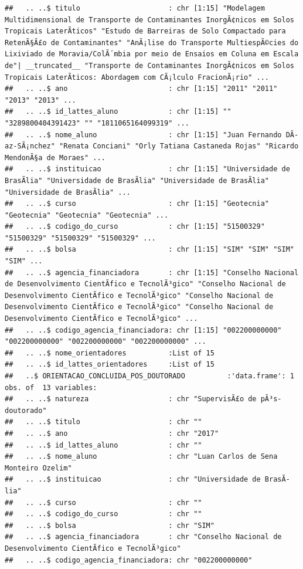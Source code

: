 \documentclass[]{article}
\begin{document}
\begin{verbatim}
##   .. ..$ titulo                     : chr [1:15] "Modelagem Multidimensional de Transporte de Contaminantes InorgÃ¢nicos em Solos Tropicais LaterÃ­ticos" "Estudo de Barreiras de Solo Compactado para RetenÃ§Ã£o de Contaminantes" "AnÃ¡lise do Transporte MultiespÃ©cies do Lixiviado de Moravia/ColÃ´mbia por meio de Ensaios em Coluna em Escala de"| __truncated__ "Transporte de Contaminantes InorgÃ¢nicos em Solos Tropicais LaterÃ­ticos: Abordagem com CÃ¡lculo FracionÃ¡rio" ...
##   .. ..$ ano                        : chr [1:15] "2011" "2011" "2013" "2013" ...
##   .. ..$ id_lattes_aluno            : chr [1:15] "" "3289800404391423" "" "1811065164099319" ...
##   .. ..$ nome_aluno                 : chr [1:15] "Juan Fernando DÃ­az-SÃ¡nchez" "Renata Conciani" "Orly Tatiana Castaneda Rojas" "Ricardo MendonÃ§a de Moraes" ...
##   .. ..$ instituicao                : chr [1:15] "Universidade de BrasÃ­lia" "Universidade de BrasÃ­lia" "Universidade de BrasÃ­lia" "Universidade de BrasÃ­lia" ...
##   .. ..$ curso                      : chr [1:15] "Geotecnia" "Geotecnia" "Geotecnia" "Geotecnia" ...
##   .. ..$ codigo_do_curso            : chr [1:15] "51500329" "51500329" "51500329" "51500329" ...
##   .. ..$ bolsa                      : chr [1:15] "SIM" "SIM" "SIM" "SIM" ...
##   .. ..$ agencia_financiadora       : chr [1:15] "Conselho Nacional de Desenvolvimento CientÃ­fico e TecnolÃ³gico" "Conselho Nacional de Desenvolvimento CientÃ­fico e TecnolÃ³gico" "Conselho Nacional de Desenvolvimento CientÃ­fico e TecnolÃ³gico" "Conselho Nacional de Desenvolvimento CientÃ­fico e TecnolÃ³gico" ...
##   .. ..$ codigo_agencia_financiadora: chr [1:15] "002200000000" "002200000000" "002200000000" "002200000000" ...
##   .. ..$ nome_orientadores          :List of 15
##   .. ..$ id_lattes_orientadores     :List of 15
##   ..$ ORIENTACAO_CONCLUIDA_POS_DOUTORADO          :'data.frame': 1 obs. of  13 variables:
##   .. ..$ natureza                   : chr "SupervisÃ£o de pÃ³s-doutorado"
##   .. ..$ titulo                     : chr ""
##   .. ..$ ano                        : chr "2017"
##   .. ..$ id_lattes_aluno            : chr ""
##   .. ..$ nome_aluno                 : chr "Luan Carlos de Sena Monteiro Ozelim"
##   .. ..$ instituicao                : chr "Universidade de BrasÃ­lia"
##   .. ..$ curso                      : chr ""
##   .. ..$ codigo_do_curso            : chr ""
##   .. ..$ bolsa                      : chr "SIM"
##   .. ..$ agencia_financiadora       : chr "Conselho Nacional de Desenvolvimento CientÃ­fico e TecnolÃ³gico"
##   .. ..$ codigo_agencia_financiadora: chr "002200000000"

\end{verbatim}
\end{document}
